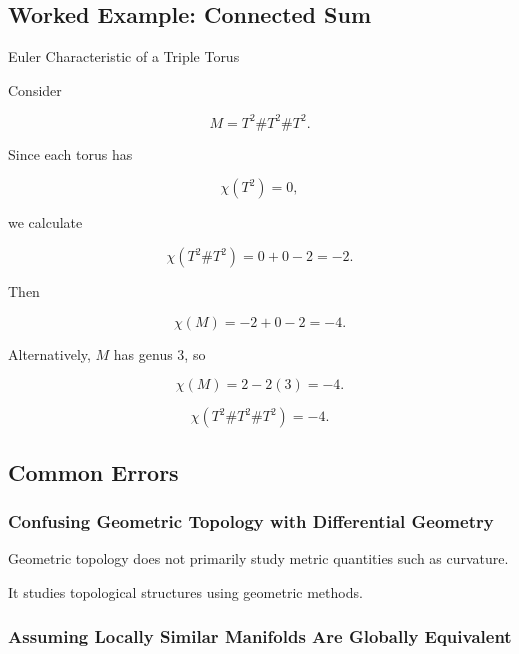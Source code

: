 \subsection{Worked Example: Connected Sum}
\label{subsec:worked-connected-sum}

\begin{workedexamplebox}{Euler Characteristic of a Triple Torus}

Consider

\[
M
=
T^2\#T^2\#T^2.
\]

Since each torus has

\[
\chi(T^2)=0,
\]

we calculate

\[
\chi(T^2\#T^2)
=
0+0-2
=
-2.
\]

Then

\[
\chi(M)
=
-2+0-2
=
-4.
\]

Alternatively, \(M\) has genus \(3\), so

\[
\chi(M)
=
2-2(3)
=
-4.
\]

\begin{answerbox}
\[
\boxed{
\chi(T^2\#T^2\#T^2)=-4.
}
\]
\end{answerbox}
\end{workedexamplebox}

\subsection{Common Errors}
\label{subsec:geometric-topology-common-errors}

\subsubsection{Confusing Geometric Topology with Differential Geometry}

Geometric topology does not primarily study metric quantities such as
curvature.

It studies topological structures using geometric methods.

\subsubsection{Assuming Locally Similar Manifolds Are Globally Equivalent}

